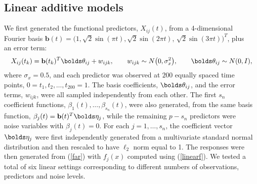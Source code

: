 \documentclass[aos,MSNbibl,dvips]{arximspdf}
\newcommand{\btheta}{\bolds\theta}
\newcommand{\bfeta}{\bolds\eta}
\newcommand{\bb}{\mathbf{b}}
\begin{document}
\subsection{Linear additive models}
\label{linear}

We\vspace*{1pt} first generated the functional predictors, $X_{ij}(t)$, from a
4-dimensional Fourier basis $\bb(t)= (1, \sqrt{2}\sin(\pi t), \sqrt
{2}\sin(2\pi t)$, $ \sqrt{2}\sin(3\pi t))^T$, plus an error term:
%
\begin{eqnarray*}
&& X_{ij}(t_k) = \bb(t_k)^T
\btheta_{ij}+w_{ijk}, \qquad w_{ijk} \sim N\bigl(0,
\sigma_x^2\bigr), \qquad\btheta_{ij} \sim N(0,
I),
\end{eqnarray*}
%
where $\sigma_x = 0.5$, and each predictor was observed at $200$ equally
spaced time points, $0=t_1, t_2,\ldots, t_{200}=1$.
The basis
coefficients, $\btheta_{ij}$, and the error terms, $w_{ijk}$, were all
sampled independently from each other.
The first $s_n$ coefficient functions, $\beta_1(t), \ldots, \beta
_{s_n}(t)$, were
also generated, from the same basis function, $\beta_j(t)=\bb
(t)^T\bfeta_j$,
while the remaining $p-s_n$ predictors were noise variables with
$\beta_j(t)=0$. For each $j=1,\ldots, s_n$, the coefficient vector
$\bfeta_j$ were first independently generated from a multivariate
standard normal distribution and then rescaled to have $\ell_2$ norm
equal to 1. The responses were then generated from (\ref{far}) with
$f_j(x)$ computed using (\ref{linearf}). We tested a total of six
linear settings corresponding to different numbers of observations,
predictors and noise levels.

\end{document}
